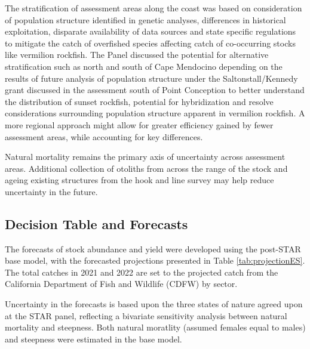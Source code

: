 \documentclass[11pt,
  english,
  a4paper,
]{article}
\begin{document}
\leavevmode\tagmcend\tagstructend

The stratification of assessment areas along the coast was based on consideration of population structure identified in genetic analyses, differences in historical exploitation, disparate availability of data sources and state specific regulations to mitigate the catch of overfished species affecting catch of co-occurring stocks like vermilion rockfish. The Panel discussed the potential for alternative stratification such as north and south of Cape Mendocino depending on the results of future analysis of population structure under the Saltonstall/Kennedy grant discussed in the assessment south of Point Conception to better understand the distribution of sunset rockfish, potential for hybridization and resolve considerations surrounding population structure apparent in vermilion rockfish. A more regional approach might allow for greater efficiency gained by fewer assessment areas, while accounting for key differences.

Natural mortality remains the primary axis of uncertainty across assessment areas. Additional collection of otoliths from across the range of the stock and ageing existing structures from the hook and line survey may help reduce uncertainty in the future.

\FloatBarrier


\hypertarget{decision-table-and-forecasts}{%
\subsection*{Decision Table and Forecasts}\label{decision-table-and-forecasts}}

\leavevmode\tagmcend\tagstructend

The forecasts of stock abundance and yield were developed using the post-STAR base model, with the forecasted projections presented in Table \ref{tab:projectionES}. The total catches in 2021 and 2022 are set to the projected catch from the California Department of Fish and Wildlife (CDFW) by sector.

Uncertainty in the forecasts is based upon the three states of nature agreed upon at the STAR panel, reflecting a bivariate sensitivity analysis between natural mortality and steepness. Both natural moratlity (assumed females equal to males) and steepness were estimated in the base model.
\end{document}
